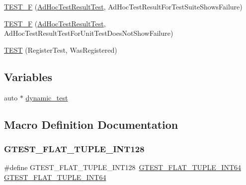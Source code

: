 \begin{DoxyCompactItemize}
\item 
\mbox{\hyperlink{_obj__test_2lib_2googletest-master_2googletest_2test_2gtest__unittest_8cc_ab6a117532a0f082cb3c81919bac920af}{T\+E\+S\+T\+\_\+F}} (\mbox{\hyperlink{class_ad_hoc_test_result_test}{Ad\+Hoc\+Test\+Result\+Test}}, Ad\+Hoc\+Test\+Result\+For\+Test\+Suite\+Shows\+Failure)
\item 
\mbox{\hyperlink{_obj__test_2lib_2googletest-master_2googletest_2test_2gtest__unittest_8cc_aa2c9c77ebded668b7830e50f6be238d9}{T\+E\+S\+T\+\_\+F}} (\mbox{\hyperlink{class_ad_hoc_test_result_test}{Ad\+Hoc\+Test\+Result\+Test}}, Ad\+Hoc\+Test\+Result\+Test\+For\+Unit\+Test\+Does\+Not\+Show\+Failure)
\item 
\mbox{\hyperlink{_obj__test_2lib_2googletest-master_2googletest_2test_2gtest__unittest_8cc_acc22a4bbd8fccca7340330c689e8eae0}{T\+E\+ST}} (Register\+Test, Was\+Registered)
\end{DoxyCompactItemize}
\subsection*{Variables}
\begin{DoxyCompactItemize}
\item 
auto $\ast$ \mbox{\hyperlink{_obj__test_2lib_2googletest-master_2googletest_2test_2gtest__unittest_8cc_a0e7f4300994a060678c15c0105f21378}{dynamic\+\_\+test}}
\end{DoxyCompactItemize}


\subsection{Macro Definition Documentation}
\mbox{\label{_obj__test_2lib_2googletest-master_2googletest_2test_2gtest__unittest_8cc_a0ff3eef0b1e2abfee41bdab9631f41ae}} 
\subsubsection{\texorpdfstring{GTEST\_FLAT\_TUPLE\_INT128}{GTEST\_FLAT\_TUPLE\_INT128}}
{\footnotesize\ttfamily \#define G\+T\+E\+S\+T\+\_\+\+F\+L\+A\+T\+\_\+\+T\+U\+P\+L\+E\+\_\+\+I\+N\+T128~\mbox{\hyperlink{_obj__test_2lib_2googletest-master_2googletest_2test_2gtest__unittest_8cc_a505487ba755aefa89ddfdc9127621c11}{G\+T\+E\+S\+T\+\_\+\+F\+L\+A\+T\+\_\+\+T\+U\+P\+L\+E\+\_\+\+I\+N\+T64}} \mbox{\hyperlink{_obj__test_2lib_2googletest-master_2googletest_2test_2gtest__unittest_8cc_a505487ba755aefa89ddfdc9127621c11}{G\+T\+E\+S\+T\+\_\+\+F\+L\+A\+T\+\_\+\+T\+U\+P\+L\+E\+\_\+\+I\+N\+T64}}}

